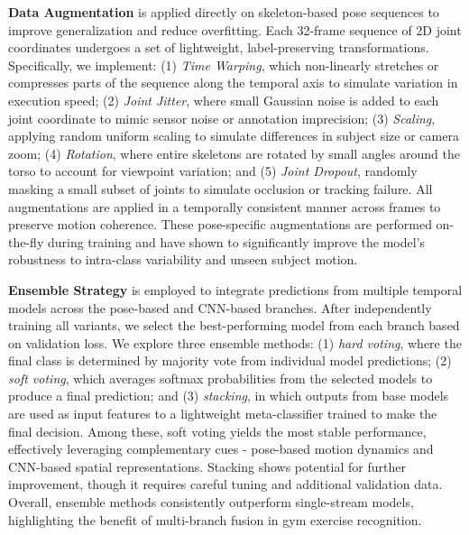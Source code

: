 \documentclass[journal,onecolumn, 11pt]{IEEEtran}
\begin{document}
\textbf{Data Augmentation} is applied directly on skeleton-based pose sequences to improve generalization and reduce overfitting. Each 32-frame sequence of 2D joint coordinates undergoes a set of lightweight, label-preserving transformations. Specifically, we implement: (1) \textit{Time Warping}, which non-linearly stretches or compresses parts of the sequence along the temporal axis to simulate variation in execution speed; (2) \textit{Joint Jitter}, where small Gaussian noise is added to each joint coordinate to mimic sensor noise or annotation imprecision; (3) \textit{Scaling}, applying random uniform scaling to simulate differences in subject size or camera zoom; (4) \textit{Rotation}, where entire skeletons are rotated by small angles around the torso to account for viewpoint variation; and (5) \textit{Joint Dropout}, randomly masking a small subset of joints to simulate occlusion or tracking failure. All augmentations are applied in a temporally consistent manner across frames to preserve motion coherence. These pose-specific augmentations are performed on-the-fly during training and have shown to significantly improve the model's robustness to intra-class variability and unseen subject motion.\cite{ko2024augmentation}

\textbf{Ensemble Strategy} is employed to integrate predictions from multiple temporal models across the pose-based and CNN-based branches. After independently training all variants, we select the best-performing model from each branch based on validation loss. We explore three ensemble methods: (1) \textit{hard voting}, where the final class is determined by majority vote from individual model predictions; (2) \textit{soft voting}, which averages softmax probabilities from the selected models to produce a final prediction; and (3) \textit{stacking}, in which outputs from base models are used as input features to a lightweight meta-classifier trained to make the final decision. Among these, soft voting yields the most stable performance, effectively leveraging complementary cues - pose-based motion dynamics and CNN-based spatial representations. Stacking shows potential for further improvement, though it requires careful tuning and additional validation data. Overall, ensemble methods consistently outperform single-stream models, highlighting the benefit of multi-branch fusion in gym exercise recognition.\cite{wolpert1992stacking}

\end{document}
